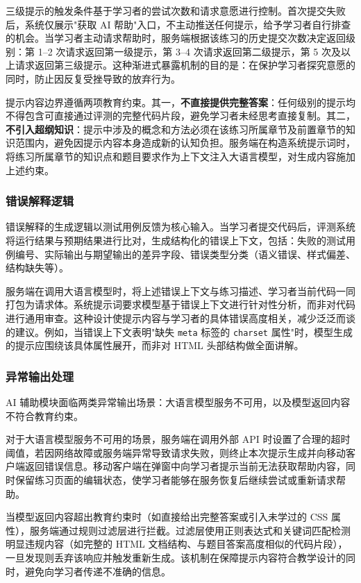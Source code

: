 三级提示的触发条件基于学习者的尝试次数和请求意愿进行控制。首次提交失败后，系统仅展示"获取 AI 帮助"入口，不主动推送任何提示，给予学习者自行排查的机会。当学习者主动请求帮助时，服务端根据该练习的历史提交次数决定返回级别：第 1--2 次请求返回第一级提示，第 3--4 次请求返回第二级提示，第 5 次及以上请求返回第三级提示。这种渐进式暴露机制的目的是：在保护学习者探究意愿的同时，防止因反复受挫导致的放弃行为。

提示内容边界遵循两项教育约束。其一，\textbf{不直接提供完整答案}：任何级别的提示均不得包含可直接通过评测的完整代码片段，避免学习者未经思考直接复制。其二，\textbf{不引入超纲知识}：提示中涉及的概念和方法必须在该练习所属章节及前置章节的知识范围内，避免因提示内容本身造成新的认知负担。服务端在构造系统提示词时，将练习所属章节的知识点和题目要求作为上下文注入大语言模型，对生成内容施加上述约束。

\subsubsection{错误解释逻辑}

错误解释的生成逻辑以测试用例反馈为核心输入。当学习者提交代码后，评测系统将运行结果与预期结果进行比对，生成结构化的错误上下文，包括：失败的测试用例编号、实际输出与期望输出的差异字段、错误类型分类（语义错误、样式偏差、结构缺失等）。

服务端在调用大语言模型时，将上述错误上下文与练习描述、学习者当前代码一同打包为请求体。系统提示词要求模型基于错误上下文进行针对性分析，而非对代码进行通用审查。这种设计使提示内容与学习者的具体错误高度相关，减少泛泛而谈的建议。例如，当错误上下文表明"缺失 \texttt{meta} 标签的 \texttt{charset} 属性"时，模型生成的提示应围绕该具体属性展开，而非对 HTML 头部结构做全面讲解。

\subsubsection{异常输出处理}

AI 辅助模块面临两类异常输出场景：大语言模型服务不可用，以及模型返回内容不符合教育约束。

对于大语言模型服务不可用的场景，服务端在调用外部 API 时设置了合理的超时阈值，若因网络故障或服务端异常导致请求失败，则终止本次提示生成并向移动客户端返回错误信息。移动客户端在弹窗中向学习者提示当前无法获取帮助内容，同时保留练习页面的编辑状态，使学习者能够在服务恢复后继续尝试或重新请求帮助。

当模型返回内容超出教育约束时（如直接给出完整答案或引入未学过的 CSS 属性），服务端通过规则过滤层进行拦截。过滤层使用正则表达式和关键词匹配检测明显违规内容（如完整的 HTML 文档结构、与题目答案高度相似的代码片段），一旦发现则丢弃该响应并触发重新生成。该机制在保障提示内容符合教学设计的同时，避免向学习者传递不准确的信息。

